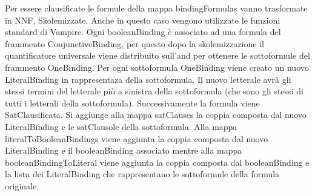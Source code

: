 \documentclass[./main.tex]{subfiles}
\begin{document}
Per essere clausificate le formule della mappa bindingFormulas vanno trasformate in NNF, Skolemizzate.
Anche in questo caso vengono utilizzate le funzioni standard di Vampire. 
Ogni booleanBinding è associato ad una formula del frammento ConjunctiveBinding,
per questo dopo la skolemizzazione il quantificatore universale viene distribuito sull'and per ottenere le sottoformule del frammento OneBinding.
Per ogni sottoformula OneBinding viene creato un nuovo LiteralBinding in rappresentaza della sottoformula.
Il nuovo letterale avrà gli stessi termini del letterale più a sinistra della sottoformula (che sono gli stessi di tutti i letterali della sottoformula).
Successivamente la formula viene SatClausificata. 
Si aggiunge alla mappa satClauses la coppia composta dal nuovo LiteralBinding e le satClausole della sottoformula.
Alla mappa literalToBooleanBindings viene aggiunta la coppia composta dal nuovo LiteralBinding e il booleanBinding associato mentre alla mappa
booleanBindingToLiteral viene aggiunta la coppia composta dal booleanBinding e la lista dei LiteralBinding che rappresentano le sottoformule della formula originale.  


\end{document}
